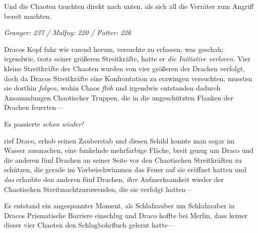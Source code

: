 Und die Chaoten tauchten direkt nach unten, als sich all die Verräter zum Angriff bereit machten.

\later

\emph{Granger: 237 / Malfoy: 220 / Potter: 226}

Dracos Kopf fuhr wie rasend herum, versuchte zu erfassen, was geschah; irgendwie, trotz seiner größeren Streitkräfte, hatte er \emph{die Initiative verloren.} Vier kleine Streitkräfte der Chaoten wurden von vier größeren der Drachen verfolgt, doch da Dracos Streitkräfte eine Konfrontation zu erzwingen versuchten, mussten sie dorthin \emph{folgen}, wohin Chaos \emph{floh} und irgendwie entstanden dadurch Ansammlungen Chaotischer Truppen, die in die ungeschützten Flanken der Drachen feuerten—

Es passierte \emph{schon wieder!}

 rief Draco, erhob seinen Zauberstab und diesen Schild konnte man sogar im Wasser ausmachen, eine funkelnde mehrfarbige Fläche, breit genug um Draco und die anderen fünf Drachen an seiner Seite vor den Chaotischen Streitkräften zu schützen, die gerade im Vorbeischwimmen das Feuer auf sie eröffnet hatten und \emph{das} erlaubte den anderen fünf Drachen, \emph{ihre} Aufmerksamkeit wieder der Chaotischen Streitmachtzuzuwenden, die sie verfolgt hatten—

Es entstand ein angespannter Moment, als Schlafzauber um Schlafzauber in Dracos Prismatische Barriere einschlug und Draco hoffte bei Merlin, dass keiner dieser vier Chaoten den Schlagbohrfluch gelernt hatte—

